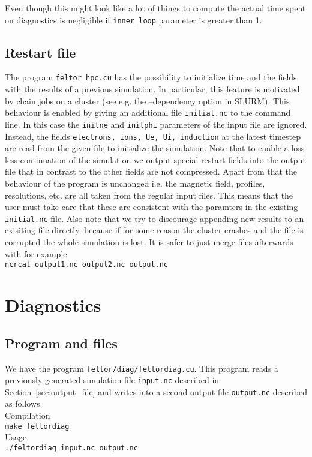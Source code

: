 Even though this might look like a lot of things to compute the actual time spent on diagnostics is negligible if {\tt inner\_loop} parameter is greater than 1.
\subsection{Restart file} \label{sec:restart_file}
The program \texttt{feltor\_hpc.cu} has the possibility to initialize time and the fields with
the results of a previous simulation. In particular, this feature is motivated by chain jobs on a cluster
(see e.g. the --dependency option in SLURM).
This behaviour is enabled by giving an additional file \texttt{initial.nc}
to the command line. In this case the \texttt{initne} and \texttt{initphi} parameters of the input
file are ignored. Instead, the fields \texttt{electrons, ions, Ue, Ui, induction} at the latest timestep
are read from the given file to initialize the simulation.
Note that to enable a loss-less continuation of the simulation we output special restart fields into the output file that in contrast to the other fields
are not compressed.
Apart from that the behaviour of the program is unchanged i.e. the magnetic field, profiles, resolutions, etc.
are all taken from the regular input files. This means that the user must take care that these are consistent
with the paramters in the existing \texttt{initial.nc} file. Also note that we try to discourage
appending new results to an exisiting file directly,
because if for some reason the cluster crashes and the file is corrupted
the whole simulation is lost. It is safer to just merge files afterwards with for example\\
\texttt{ncrcat output1.nc output2.nc output.nc}
\section{Diagnostics}\label{sec:diagnostics}
\subsection{Program and files}
We have the program \texttt{feltor/diag/feltordiag.cu}.
This program reads a previously generated simulation file \texttt{input.nc} described in Section~\ref{sec:output_file} and writes into a second output file \texttt{output.nc} described as follows. \\
Compilation\\
\texttt{make feltordiag} \\
Usage \\
\texttt{./feltordiag input.nc output.nc} \\

